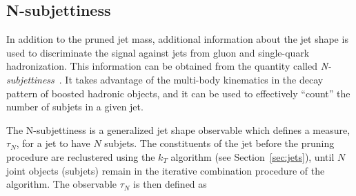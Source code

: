 

\subsection{N-subjettiness}
\label{subsec:nsubj}

In addition to the pruned jet mass, additional information about the jet shape is used to discriminate the signal against jets from gluon and single-quark hadronization. This information can be obtained from the quantity called \emph{N-subjettiness}~\cite{Thaler:2010tr}. It takes advantage of the multi-body kinematics in the decay pattern of boosted hadronic objects, and it can be used to effectively ``count'' the number of subjets in a given jet. 

The N-subjettiness is a generalized jet shape observable which defines a measure, $\tau_N$, for a jet to have $N$ subjets. The constituents of the jet before the pruning procedure are reclustered using the $k_T$ algorithm (see Section~\ref{sec:jets}), until $N$ joint objects (subjets) remain in the iterative combination procedure of the algorithm. The observable $\tau_N$ is then defined as

